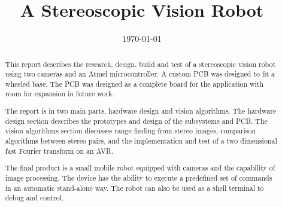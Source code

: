 \documentclass{ecsproject}      %
\begin{document}
\frontmatter
\title      {A Stereoscopic Vision Robot}
\addresses  {\groupname\\\deptname\\\univname}
\date       {\today}
\subject    {}
\keywords   {}
\maketitle

\begin{abstract}
This report describes the research, design, build and test of a stereoscopic vision robot using two cameras and an Atmel microcontroller. A custom PCB was designed to fit a wheeled base. The PCB was designed as a complete board for the application with room for expansion in future work.

The report is in two main parts, hardware design and vision algorithms. The hardware design section describes the prototypes and design of the subsystems and PCB.
The vision algorithms section discusses range finding from stereo images, comparison algorithms between stereo pairs, and the implementation and test of a two dimensional fast Fourier transform on an AVR. 

The final product is a small mobile robot equipped with cameras and the capability of image processing. The device has the ability to execute a predefined set of commands in an automatic stand-alone way. The robot can also be used as a shell terminal to debug and control.
\end{abstract}
\end{document}
